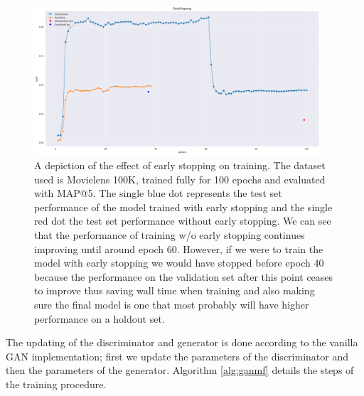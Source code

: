 \begin{figure}
    \centering
    \includegraphics[width=0.95\textwidth]{model/EarlyStopping.png}
    \caption{A depiction of the effect of early stopping on training. The dataset used is Movielens 100K, trained fully for 100 epochs and evaluated with MAP@5. The single blue dot represents the test set performance of the model trained with early stopping and the single red dot the test set performance without early stopping. We can see that the performance of training w/o early stopping continues improving until around epoch 60. However, if we were to train the model with early stopping we would have stopped before epoch 40 because the performance on the validation set after this point ceases to improve thus saving wall time when training and also making sure the final model is one that most probably will have higher performance on a holdout set.}
    \label{fig:earlystopping}
\end{figure}


The updating of the discriminator and generator is done according to the vanilla GAN implementation; first we update the parameters of the discriminator and then the parameters of the generator. Algorithm \ref{alg:ganmf} details the steps of the training procedure.

